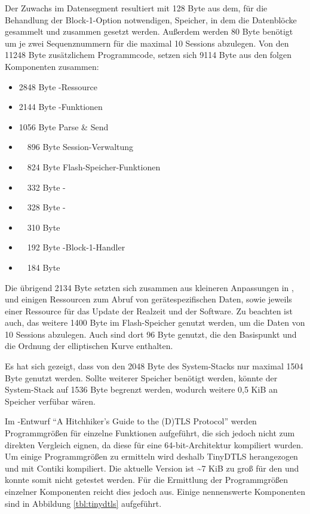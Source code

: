 Der Zuwachs im Datensegment resultiert mit 128 Byte aus dem, für die Behandlung der Block-1-Option notwendigen, Speicher, in dem die Datenblöcke gesammelt und
zusammen gesetzt werden. Außerdem werden 80 Byte benötigt um je zwei Sequenznummern für die maximal 10 Sessions abzulegen. Von den 11248 Byte zusätzlichem
Programmcode, setzen sich 9114 Byte aus den folgen Komponenten zusammen:
\begin{itemize}
  \item  2848 Byte -Ressource
  \item  2144 Byte -Funktionen
  \item  1056 Byte Parse \& Send
  \item ~~896 Byte Session-Verwaltung
  \item ~~824 Byte Flash-Speicher-Funktionen
  \item ~~332 Byte -
  \item ~~328 Byte -
  \item ~~310 Byte 
  \item ~~192 Byte -Block-1-Handler
  \item ~~184 Byte 
\end{itemize}
Die übrigend 2134 Byte setzten sich zusammen aus kleineren Anpassungen in , und einigen Ressourcen zum Abruf von gerätespezifischen Daten,
sowie jeweils einer Ressource für das Update der Realzeit und der Software. Zu beachten ist auch, das weitere 1400 Byte im Flash-Speicher genutzt werden,
um die Daten von 10 Sessions abzulegen. Auch sind dort 96 Byte genutzt, die den Basispunkt und die Ordnung der elliptischen Kurve enthalten.

Es hat sich gezeigt, dass von den 2048 Byte des System-Stacks nur maximal 1504 Byte genutzt werden. Sollte weiterer Speicher benötigt werden, könnte
der System-Stack auf 1536 Byte begrenzt werden, wodurch weitere 0,5 KiB an Speicher verfübar wären.

%
Im -Entwurf "`A Hitchhiker's Guide to the (D)TLS Protocol"' \cite{draftmintls} werden Programmgrößen für einzelne
Funktionen aufgeführt, die sich jedoch nicht zum direkten Vergleich eignen, da diese für eine 64-bit-Architektur kompiliert wurden.
Um einige Programmgrößen zu ermitteln wird deshalb TinyDTLS \cite{tinydtls} herangezogen und mit Contiki kompiliert.
Die aktuelle Version ist \textasciitilde 7 KiB zu groß für den  und konnte somit nicht getestet werden. Für die Ermittlung
der Programmgrößen einzelner Komponenten reicht dies jedoch aus. Einige nennenswerte Komponenten sind in Abbildung \ref{tbl:tinydtls} aufgeführt.

